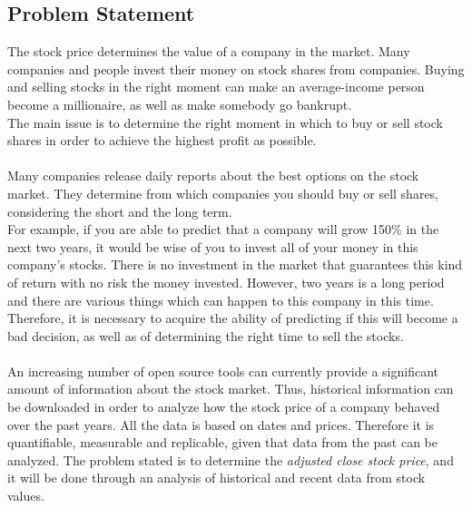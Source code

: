 \subsection{Problem Statement}
The stock price determines the value of a company in the market. Many companies and people invest their money on stock shares from companies. Buying and selling stocks in the right 
moment can make an average-income person become a millionaire, as well as make somebody go bankrupt.\\
The main issue is to determine the right moment in which to buy or sell stock shares in order to achieve the highest profit as possible.\\
\newline
\\
Many companies release daily reports about the best options on the stock market. They determine from which companies you should buy or sell shares, considering the short and the long term.\\
For example, if you are able to predict that a company will grow 150\% in the next two years, it would be wise of you to invest all of your money in this company's stocks. There is no investment in the market that 
guarantees this kind of return with no risk the money invested. However, two years is a long period and there are various things which can happen to this company in this time. Therefore, it is necessary to
acquire the ability of predicting if this will become a bad decision, as well as of determining the right time to sell the stocks.\\
\newline
\\
An increasing number of open source tools can currently provide a significant amount of information about the stock market. Thus, historical information can be downloaded in order to analyze 
how the stock price of a company behaved over the past years. All the data is based on dates and prices. Therefore it is quantifiable, measurable and replicable, given that data 
from the past can be analyzed.
The problem stated is to determine the \emph{adjusted close stock price}, and it will be done through an analysis of historical and recent data from stock values.\\


